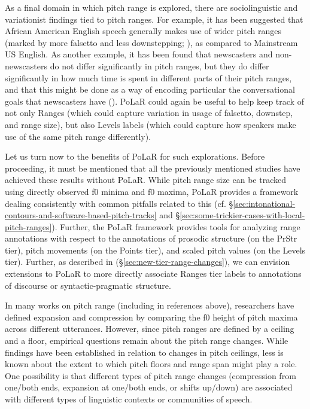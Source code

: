 \documentclass[11pt, twoside]{memoir}
\begin{document}
As a final domain in which pitch range is explored, there are sociolinguistic and variationist findings tied to pitch ranges. For example, it has been suggested that African American English speech generally makes use of wider pitch ranges (marked by more falsetto and less downstepping; \citealt{wolfram-02, thomas07}), as compared to Mainstream US English. As another example, it has been found that newscasters and non-newscasters do not differ significantly in pitch ranges, but they do differ significantly in how much time is spent in different parts of their pitch ranges, and that this might be done as a way of encoding particular the conversational goals that newscasters have (\citealt{gasser-19}). PoLaR could again be useful to help keep track of not only Ranges (which could capture variation in usage of falsetto, downstep, and range size), but also Levels labels (which could capture how speakers make use of the same pitch range differently).

Let us turn now to the benefits of PoLaR for such explorations. Before proceeding, it must be mentioned that all the previously mentioned studies have achieved these results without PoLaR. While pitch range size can be tracked using directly observed f0 minima and f0 maxima, PoLaR provides a framework  dealing consistently with common pitfalls related to this (cf. §\ref{sec:intonational-contours-and-software-based-pitch-tracks} and §\ref{sec:some-trickier-cases-with-local-pitch-ranges}). Further, the PoLaR framework provides tools for analyzing range annotations with respect to the annotations of prosodic structure (on the PrStr tier), pitch movements (on the Points tier), and scaled pitch values (on the Levels tier). Further, as described in (§\ref{sec:new-tier-range-changes}), we can envision extensions to PoLaR to more directly associate Ranges tier labels to annotations of discourse or syntactic-pragmatic structure. 
%
\newline

In many works on pitch range (including in references above), researchers have defined expansion and compression by comparing the f0 height of pitch maxima across different utterances. However, since pitch ranges are defined by a ceiling and a floor, empirical questions remain about the pitch range changes. While findings have been established in relation to changes in pitch ceilings, less is known about the extent to which pitch floors and range span might play a role. One possibility is that different types of pitch range changes (compression from one\slash both ends, expansion at one\slash both ends, or shifts up\slash down) are associated with different types of linguistic contexts or communities of speech.
\end{document}
